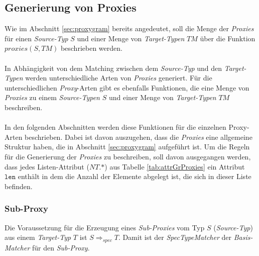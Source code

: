 \subsection{Generierung von Proxies}\label{sec_proxyGen}
Wie im Abschnitt \ref{sec:proxygram} bereits angedeutet, soll die Menge der \emph{Proxies} für einen \emph{Source-Typ} $S$ und einer Menge von \emph{Target-Typen} $\mathit{TM}$ über die Funktion $\mathit{proxies(S,\mathit{TM})}$ beschrieben werden.
\\\\
In Abhängigkeit von dem Matching zwischen dem \emph{Source-Typ} und den \emph{Target-Typen} werden unterschiedliche Arten von \emph{Proxies} generiert. Für die unterschiedlichen \emph{Proxy}-Arten gibt es ebenfalls Funktionen, die eine Menge von \emph{Proxies} zu einem \emph{Source-Typen} $S$ und einer Menge von \emph{Target-Typen} $\mathit{TM}$ beschreiben.
\\\\
In den folgenden Abschnitten werden diese Funktionen für die einzelnen Proxy-Arten beschrieben. Dabei ist davon auszugehen, dass die \emph{Proxies} eine allgemeine Struktur haben, die in Abschnitt \ref{sec:proxygram} aufgeführt ist. Um die Regeln für die Generierung der \emph{Proxies} zu beschreiben, soll davon ausgegangen werden, dass jedes Listen-Attribut ($\mathit{NT.}\text{*}$) aus Tabelle \ref{tab:attrGrProxies} ein Attribut $\texttt{len}$ enthält in dem die Anzahl der Elemente abgelegt ist, die sich in dieser Liste befinden.


\subsubsection{Sub-Proxy}
Die Voraussetzung für die Erzeugung eines \emph{Sub-Proxies} vom Typ $S$ (\emph{Source-Typ}) aus einem \emph{Target-Typ} $\mathit{T}$ ist $S \Rightarrow_{spec} T$. Damit ist der \emph{SpecTypeMatcher} der \emph{Basis-Matcher} für den \emph{Sub-Proxy}.
